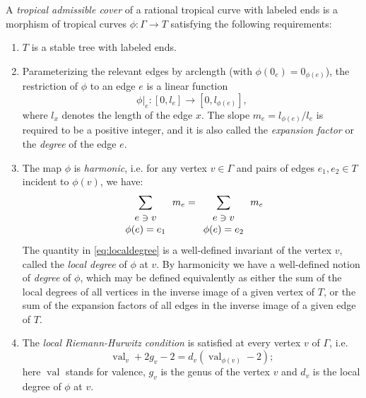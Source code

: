 \documentclass[11pt,reqno]{amsart}
\theoremstyle{definition}
\DeclareMathOperator{\val}{val}
\begin{document}
A {\it tropical admissible cover} of a rational tropical curve with labeled ends is a  morphism of tropical curves $\phi: \Gamma \to T$ satisfying the following requirements:
\begin{enumerate}
\item $T$ is a stable tree with labeled ends.
    \item Parameterizing the relevant edges by arclength (with $\phi(0_e) = 0_{\phi(e)}$), the restriction of $\phi$ to an edge $e$ is a linear function
\begin{equation}
    \phi|_e:[0, l_e]\to [0, l_{\phi(e)}],
\end{equation}
where $l_x$  denotes the length of the edge $x$. The slope $m_e = l_{\phi(e)}/l_e$ is required to be a positive integer, and it is also called the {\it expansion factor} or the {\it degree} of the edge $e$.
\item The map $\phi$ is {\it harmonic}, i.e. for any vertex $v\in \Gamma$ and pairs of edges $e_1, e_2\in T$ incident to $\phi(v)$, we have:
\begin{equation}
    \label{eq:localdegree}
    \sum_{\tiny{\begin{array}{c}e\ni v\\ \phi(e) = e_1\end{array}}} m_e = 
       \sum_{\tiny{\begin{array}{c}e\ni v\\ \phi(e) = e_2\end{array}}} m_e
\end{equation}
The quantity in \eqref{eq:localdegree} is a well-defined invariant of the vertex $v$, called the {\it local degree} of $\phi$ at $v$. By harmonicity we have a well-defined notion of {\it degree} of $\phi$, which may be defined equivalently as either the sum of the local degrees of all vertices in the inverse image of a given vertex of $T$, or the sum of the expansion factors of all edges in the inverse image of a given edge of $T$.

\item The {\it local Riemann-Hurwitz condition} is satisfied at every vertex $v$ of $\Gamma$, i.e.
\begin{equation}
    \val_v +2g_v-2= d_v(\val_{\phi(v)}-2 );
\end{equation}
here  $\val$ stands for valence, $g_v$ is the genus of the vertex $v$ and $d_v$ is the local degree of $\phi$ at $v$.
\end{enumerate}
\end{document}
